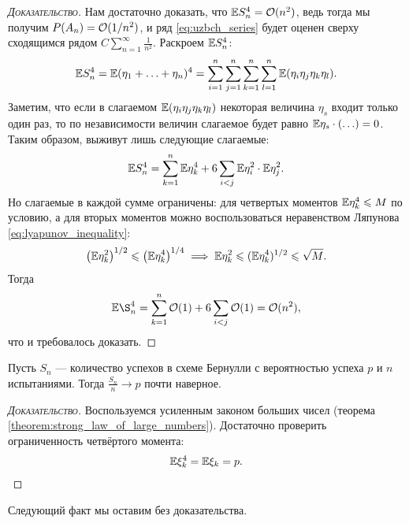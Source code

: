 \documentclass[../main.tex]{subfiles}
\begin{document}
\begin{proof}[\normalfont\textsc{Доказательство}]
 Нам достаточно доказать, что $ \mathbb E S_n^{4} = \mathcal{O}(n^{2}) $, ведь тогда мы получим $ P(A_n) = \mathcal{O}(1 / n^{2})$, и ряд \eqref{eq:uzbch_series} будет оценен сверху сходящимся рядом $ C \sum_{n=1}^{\infty} \frac{1}{n^{2}}$. Раскроем $ \mathbb E S_n^{4} $:
 \begin{align*}
  \mathbb E S_n^{4} = \mathbb E (\eta_1 + \ldots + \eta_n)^{4} = \sum_{i=1}^{n} \sum_{j=1}^{n} \sum_{k=1}^{n} \sum_{l=1}^{n} \mathbb E (\eta_i \eta_j \eta_k \eta_l).
 \end{align*} Заметим, что если в слагаемом $ \mathbb E(\eta_i \eta_j \eta_k \eta_l) $ некоторая величина $ \eta_s $ входит только один раз, то по независимости величин слагаемое будет равно $ \mathbb E \eta_s \cdot (\ldots) = 0 $. Таким образом, выживут лишь следующие слагаемые:
 \begin{align*}
  \mathbb E S_n^{4} = \sum_{k=1}^{n}\mathbb E\eta_k^{4} + 6 \sum_{i < j} \mathbb E\eta_i^{2} \cdot \mathbb E\eta_j^{2}.
 \end{align*} Но слагаемые в каждой сумме ограничены: для четвертых моментов $ \mathbb E\eta_k^{4} \leqslant M $ по условию, а для вторых моментов можно воспользоваться неравенством Ляпунова \eqref{eq:lyapunov_inequality}:
 \begin{align*}
  \left(\mathbb E \eta_k^{2} \right)^{1 / 2} \leqslant \left( \mathbb E\eta_k^{4} \right)^{1 / 4} \implies \mathbb E\eta_k^{2} \leqslant (\mathbb E\eta_k^{4})^{1 / 2} \leqslant \sqrt M.
 \end{align*} Тогда
 \begin{align*}
  \E\S_n^{4} = \sum_{k=1}^{n} \OO(1) + 6 \sum_{i < j} \OO(1) = \OO(n^{2}),
 \end{align*} что и требовалось доказать.
\end{proof}

\begin{crly}
 \label{strong_law_of_large_numbers_for_bernoulli_scheme}
 Пусть $ S_n $ --- количество успехов в схеме Бернулли с вероятностью успеха  $ p $ и  $ n $ испытаниями. Тогда $ \frac{S_n}{n} \to p $  почти наверное.
\end{crly}
\begin{proof}[\normalfont\textsc{Доказательство}]
 Воспользуемся усиленным законом больших чисел (теорема \ref{theorem:strong_law_of_large_numbers}). Достаточно проверить ограниченность четвёртого момента:
 \begin{align*}
  \mathbb E \xi_k^{4} = \mathbb E \xi_k = p.
 \end{align*}
\end{proof}

Следующий факт мы оставим без доказательства.
\end{document}
